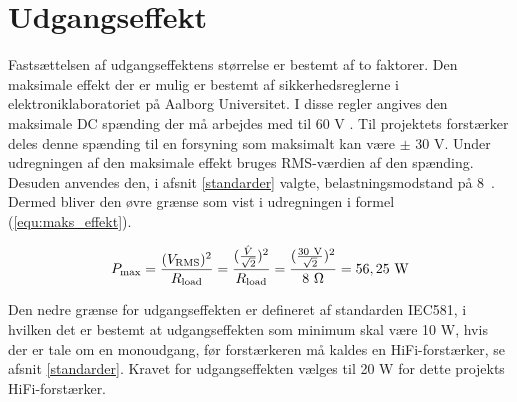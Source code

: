 \section{Udgangseffekt}
\label{valg_udgangseffekt}
Fastsættelsen af udgangseffektens størrelse er bestemt af to faktorer. Den maksimale effekt der er mulig er bestemt af sikkerhedsreglerne i elektroniklaboratoriet på Aalborg Universitet. I disse regler angives den maksimale DC spænding der må arbejdes med til 60 V \cite{elregler-b1101}. 
Til projektets forstærker deles denne spænding til en forsyning som maksimalt kan være $\pm$ 30 V. Under udregningen af den maksimale effekt bruges RMS-værdien af den spænding. Desuden anvendes den, i afsnit \ref{standarder} valgte, belastningsmodstand på 8~\ohm. Dermed bliver den øvre grænse som vist i udregningen i formel (\ref{equ:maks_effekt}).

\begin{equation}
\label{equ:maks_effekt}
P_{\mathrm{max}} = \frac{(V_{\mathrm{RMS}})^2}{R_{\mathrm{load}}}= \frac{(\frac{\hat{V}}{\sqrt{2}})^2}{R_{\mathrm{load}}} = \frac{(\frac{\mathrm{30~V}}{\sqrt{2}})^2}{8~\ohm} = \mathrm{56,25~W}
\end{equation}

Den nedre grænse for udgangseffekten er defineret af standarden IEC581, i hvilken det er bestemt at udgangseffekten som minimum skal være 10 W, hvis der er tale om en monoudgang, før forstærkeren må kaldes en HiFi-forstærker, se afsnit \ref{standarder}. Kravet for udgangseffekten vælges til 20 W for dette projekts HiFi-forstærker.
